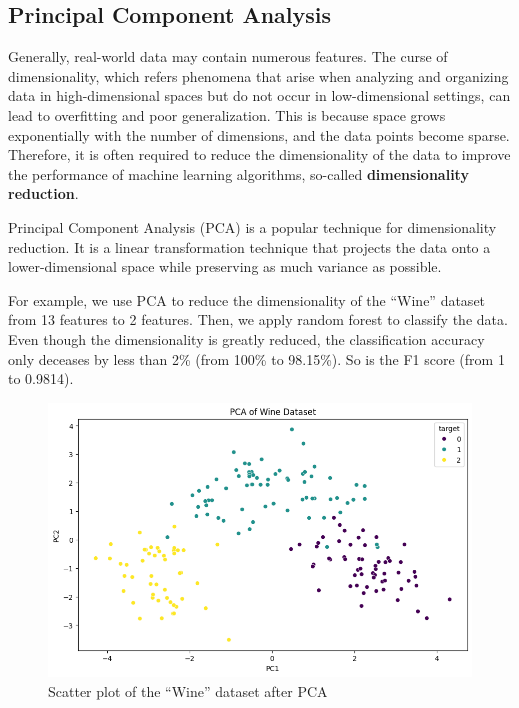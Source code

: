 \documentclass[conference]{IEEEtran}
\begin{document}
\subsection{Principal Component Analysis}

Generally, real-world data may contain numerous features.
The curse of dimensionality, which refers phenomena that arise when analyzing and organizing data in high-dimensional spaces but do not occur in low-dimensional settings, can lead to overfitting and poor generalization.
This is because space grows exponentially with the number of dimensions, and the data points become sparse.
Therefore, it is often required to reduce the dimensionality of the data to improve the performance of machine learning algorithms, so-called \textbf{dimensionality reduction}.

Principal Component Analysis (PCA) is a popular technique for dimensionality reduction.
It is a linear transformation technique that projects the data onto a lower-dimensional space while preserving as much variance as possible.

For example, we use PCA to reduce the dimensionality of the ``Wine'' dataset from 13 features to 2 features.
Then, we apply random forest to classify the data.
Even though the dimensionality is greatly reduced, the classification accuracy only deceases by less than 2\% (from 100\% to 98.15\%).
So is the F1 score (from 1 to 0.9814).

\begin{figure}[!ht]
    \centering
    \includegraphics[width=\linewidth]{figure/Wine PCA.png}
    \caption{Scatter plot of the ``Wine'' dataset after PCA}
    \label{fig:wine_pca}
\end{figure}
\end{document}

